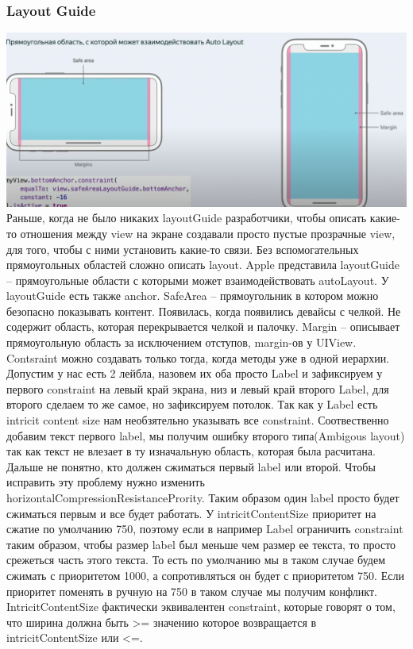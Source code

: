 \documentclass{article}
\begin{document}
    \subsubsection{Layout Guide}
    \includegraphics[scale = 0.3]{pic/Снимок экрана 2023-07-31 в 22.50.19.png}
    \newline
    Раньше, когда не было никаких layoutGuide разработчики, чтобы описать какие-то отношения между view на экране создавали просто пустые прозрачные view, для того, чтобы с ними установить какие-то связи. Без вспомогательных прямоугольных областей сложно описать layout. Apple представила layoutGuide -- прямоугольные области с которыми может взаимодействовать autoLayout. У layoutGuide есть также anchor. 
    \newline
    SafeArea -- прямоугольник в котором можно безопасно показывать контент. Появилась, когда появились девайсы с челкой. Не содержит область, которая перекрывается челкой и палочку. 
    \newline
    Margin -- описывает прямоугольную область за исключением отступов, margin-ов у UIView. 
    \newline
    Contsraint можно создавать только тогда, когда методы уже в одной иерархии. 
    \newline
    Допустим у нас есть 2 лейбла, назовем их оба просто Label и зафиксируем у первого constraint на левый край экрана, низ и левый край второго Label, для второго сделаем то же самое, но зафиксируем потолок. Так как у Label есть intricit content size нам необзятельно указывать все constraint. Соотвественно добавим текст первого label, мы получим ошибку второго типа(Ambigous layout) так как текст не влезает в ту изначальную область, которая была расчитана. Дальше не понятно, кто должен сжиматься первый label или второй. Чтобы исправить эту проблему нужно изменить horizontalCompressionResistancePrority. Таким образом один label просто будет сжиматься первым и все будет работать. 
    \newline
    У intricitContentSize приоритет на сжатие по умолчанию 750, поэтому если в например Label ограничить constraint таким образом, чтобы размер label был меньше чем размер ее текста, то просто срежеться часть этого текста. То есть по умолчанию мы в таком случае будем сжимать с приоритетом 1000, а сопротивляться он будет с  приоритетом 750. Если приоритет поменять в ручную на 750  в таком случае мы получим конфликт. 
    \newline
    IntricitContentSize фактически эквивалентен constraint, которые говорят о том, что ширина должна быть >= значению которое возвращается в intricitContentSize или <=.
    \newline
\end{document}
